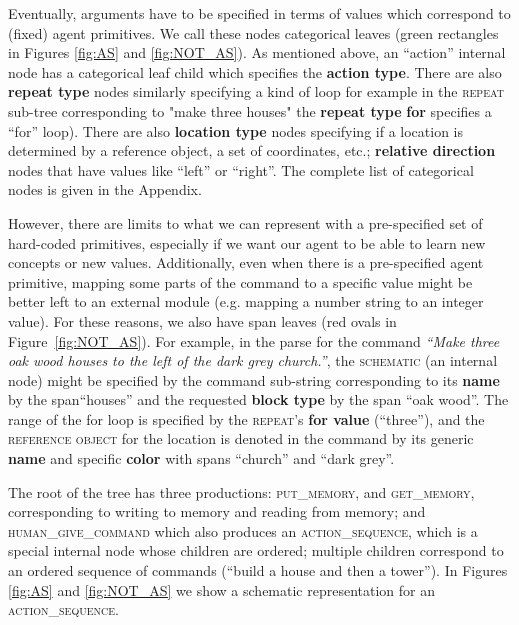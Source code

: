 \smallskip

 Eventually, arguments have to be specified in terms of values which correspond to (fixed) agent primitives. We call these nodes categorical leaves (green rectangles in Figures \ref{fig:AS} and \ref{fig:NOT_AS}).  As mentioned above, an ``action'' internal node has a categorical leaf child which specifies the \textbf{action type}. There are also \textbf{repeat type} nodes similarly specifying a kind of loop  for example in  the \textsc{repeat} sub-tree corresponding to "make three houses" the \textbf{repeat type} \textbf{for} specifies a ``for'' loop).   There are also \textbf{location type} nodes specifying if a location is determined by a reference object, a set of coordinates, etc.;  \textbf{relative direction} nodes that have values like ``left'' or ``right''. The complete list of categorical nodes is given in the Appendix.

However, there are limits to what we can represent with a pre-specified set of hard-coded primitives, especially if we want our agent to be able to learn new concepts or new values. Additionally, even when there is a pre-specified agent primitive, mapping some parts of the command to a specific value might be better left to an external module (e.g. mapping a number string to an integer value). For these reasons, we also have span leaves (red ovals in Figure~\ref{fig:NOT_AS}). %
For example, in the parse for the command  \textit{``Make three oak wood houses to the left of the dark grey church.''}, %
the \textsc{schematic} (an internal node) might be specified by the command sub-string corresponding to its \textbf{name} by the span``houses''  and the requested \textbf{block type} by the span ``oak wood''. The range of the for loop is specified by the \textsc{repeat}'s \textbf{for value} (``three''), and the \textsc{reference object} for the location is denoted in the command by its generic \textbf{name} and specific \textbf{color} with spans ``church'' and ``dark grey''.

 \smallskip

 The root of the tree has three productions:   \textsc{put\_memory}, and \textsc{get\_memory}, corresponding to writing to memory and reading from memory; and \textsc{human\_give\_command} which also produces an \textsc{action\_sequence}, which is a special internal node whose children are ordered; multiple children correspond to an ordered  sequence of commands (``build a house and then a tower'').  In Figures \ref{fig:AS} and \ref{fig:NOT_AS} we show a schematic representation for an \textsc{action\_sequence}.